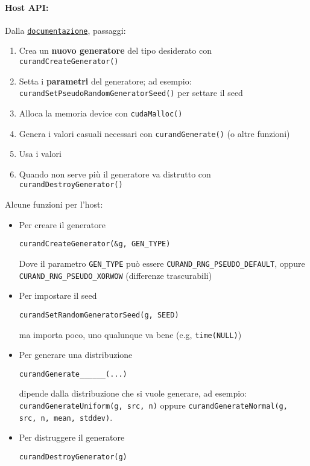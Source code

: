 \paragraph{Host API:} Dalla \href{https://docs.nvidia.com/cuda/curand/index.html}{\texttt{documentazione}}, passaggi:
\begin{enumerate}
	\item Crea un \textbf{nuovo generatore} del tipo desiderato con \texttt{curandCreateGenerator()}
	
	\item Setta i \textbf{parametri} del generatore; ad esempio: \texttt{curandSetPseudoRandomGeneratorSeed()} per settare il seed
	
	\item Alloca la memoria device con \texttt{cudaMalloc()}
	
	\item Genera i valori casuali necessari con \texttt{curandGenerate()} (o altre funzioni)
	
	\item Usa i valori
	
	\item Quando non serve più il generatore va distrutto con \texttt{curandDestroyGenerator()}
\end{enumerate}

Alcune funzioni per l'host: 
\begin{itemize}
	\item Per creare il generatore
	\begin{verbatim}
curandCreateGenerator(&g, GEN_TYPE)
	\end{verbatim}
	Dove il parametro \texttt{GEN\_TYPE} può essere \texttt{CURAND\_RNG\_PSEUDO\_DEFAULT}, oppure \texttt{CURAND\_RNG\_PSEUDO\_XORWOW} (differenze trascurabili)
	
	\item Per impostare il seed
	\begin{verbatim}
curandSetRandomGeneratorSeed(g, SEED)
	\end{verbatim}
	ma importa poco, uno qualunque va bene (e.g, \texttt{time(NULL)})
	
	\item Per generare una distribuzione
	\begin{verbatim}
curandGenerate______(...)
	\end{verbatim}
	dipende dalla distribuzione che si vuole generare, ad esempio: \texttt{curandGenerateUniform(g, src, n)} oppure \texttt{curandGenerateNormal(g, src, n, mean, stddev)}. 

	\item Per distruggere il generatore
	\begin{verbatim}
curandDestroyGenerator(g)
	\end{verbatim}
\end{itemize}

